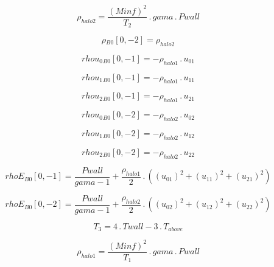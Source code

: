 \documentclass{article}
\begin{document}
\begin{dmath}\rho_{halo 2} = \frac{\left(Minf \right)^{2}}{T_{2}} \,.\, gama \,.\, Pwall\end{dmath}

\begin{dmath}{\rho{_{B0}}}[{0,-2}] = \rho_{halo 2}\end{dmath}

\begin{dmath}{rhou_{0}{_{B0}}}[{0,-1}] = - \rho_{halo 1} \,.\, u_{01}\end{dmath}

\begin{dmath}{rhou_{1}{_{B0}}}[{0,-1}] = - \rho_{halo 1} \,.\, u_{11}\end{dmath}

\begin{dmath}{rhou_{2}{_{B0}}}[{0,-1}] = - \rho_{halo 1} \,.\, u_{21}\end{dmath}

\begin{dmath}{rhou_{0}{_{B0}}}[{0,-2}] = - \rho_{halo 2} \,.\, u_{02}\end{dmath}

\begin{dmath}{rhou_{1}{_{B0}}}[{0,-2}] = - \rho_{halo 2} \,.\, u_{12}\end{dmath}

\begin{dmath}{rhou_{2}{_{B0}}}[{0,-2}] = - \rho_{halo 2} \,.\, u_{22}\end{dmath}

\begin{dmath}{rhoE{_{B0}}}[{0,-1}] = \frac{Pwall}{gama - 1} + \frac{\rho_{halo 1}}{2} \,.\, \left(\left(u_{01} \right)^{2} + \left(u_{11} \right)^{2} + \left(u_{21} \right)^{2}\right)\end{dmath}

\begin{dmath}{rhoE{_{B0}}}[{0,-2}] = \frac{Pwall}{gama - 1} + \frac{\rho_{halo 2}}{2} \,.\, \left(\left(u_{02} \right)^{2} + \left(u_{12} \right)^{2} + \left(u_{22} \right)^{2}\right)\end{dmath}

\begin{dmath}T_{3} = 4 \,.\, Twall - 3 \,.\, T_{above}\end{dmath}

\begin{dmath}\rho_{halo 1} = \frac{\left(Minf \right)^{2}}{T_{1}} \,.\, gama \,.\, Pwall\end{dmath}
\end{document}
